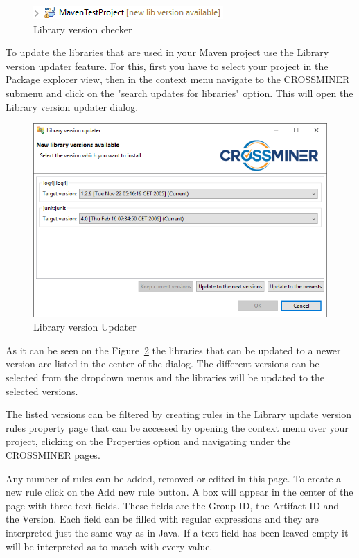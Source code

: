 \documentclass[11pt,a4paper]{book}
\begin{document}
\begin{figure}[h]
	\centering
	\includegraphics[width=.7\linewidth]{pic/library-version-checker.png}
	\caption{Library version checker}
	\label{fig:libraryVersionChecker}
\end{figure}


To update the libraries that are used in your Maven project use the Library version updater feature. For this, first you have to select your project in the Package explorer view, then in the context menu navigate to the CROSSMINER submenu and click on the "search updates for libraries" option. This will open the Library version updater dialog.

\begin{figure}[h]
	\centering
	\includegraphics[width=\linewidth]{pic/library-version-updater.png}
	\caption{Library version Updater}
	\label{fig:libraryVersionUpdater}
\end{figure}

As it can be seen on the Figure~\ref{fig:libraryVersionUpdater} the libraries that can be updated to a newer version are listed in the center of the dialog. The different versions can be selected from the dropdown menus and the libraries will be updated to the selected versions.

The listed versions can be filtered by creating rules in the Library update version rules property page that can be accessed by opening the context menu over your project, clicking on the Properties option and navigating under the CROSSMINER pages.

Any number of rules can be added, removed or edited in this page. To create a new rule click on the Add new rule button. A box will appear in the center of the page with three text fields. These fields are the Group ID, the Artifact ID and the Version. Each field can be filled with regular expressions and they are interpreted just the same way as in Java. If a text field has been leaved empty it will be interpreted as to match with every value.
\end{document}
